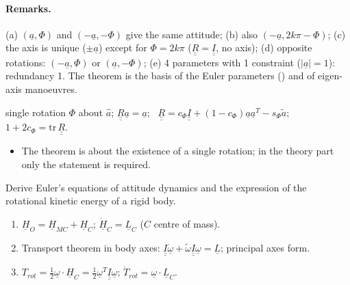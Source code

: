 \paragraph{Remarks.} (a) $(\underline a,\Phi)$ and $(-\underline a,-\Phi)$ give the same attitude; (b) also $(-\underline a,2k\pi-\Phi)$; (c) the axis is unique
($\pm\underline a$) except for $\Phi=2k\pi$ ($\underline{\underline R}=\underline{\underline I}$, no axis); (d) opposite rotations: $(-\underline a,\Phi)$ or $(\underline a,-\Phi)$;
(e) 4 parameters with 1 constraint ($|\underline a|=1$): redundancy 1. The theorem is the basis of the Euler parameters () and of eigen-axis manoeuvres.
\begin{keyf}
single rotation $\Phi$ about $\hat a$; $\underline{\underline R}\underline a=\underline a$; \ $\underline{\underline R}=c_\Phi\underline{\underline I}+(1-c_\Phi)\underline a\underline a^T-s_\Phi\tilde a$; \ $1+2c_\Phi=\mathrm{tr}\,\underline{\underline R}$.
\end{keyf}
\pitfalls
\begin{itemize}
\item The theorem is about the existence of a single rotation; in the theory part only the statement is required.
\end{itemize}

\begin{qbox}
Derive Euler's equations of attitude dynamics and the expression of the rotational kinetic energy of a rigid body.
\end{qbox}
\begin{outline}
\begin{enumerate}
\item $\underline H_O=\underline H_{MC}+\underline H_C$; $\dot{\underline H}_C=\underline L_C$ ($C$ centre of mass).
\item Transport theorem in body axes: $\underline{\underline I}\dot{\underline\omega}+\tilde\omega\underline{\underline I}\underline\omega=\underline L$; principal axes form.
\item $T_{rot}=\frac12\underline\omega\cdot\underline H_C=\frac12\underline\omega^T\underline{\underline I}\underline\omega$; $\dot T_{rot}=\underline\omega\cdot\underline L_C$.
\end{enumerate}
\end{outline}
\answer
